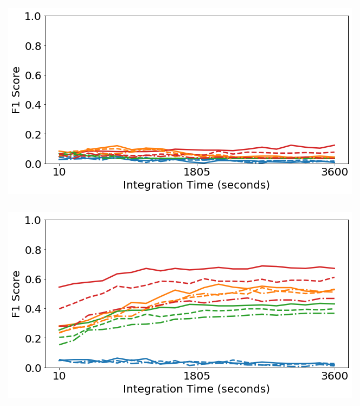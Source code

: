 \begin{figure}[H]
     \centering
     \begin{subfigure}[b]{0.49\textwidth}
         \centering
         \includegraphics[width=\textwidth]{images/generalization-shielding-aug-easy-01.png}
         \caption{}
         \label{fig:generalization-shielding-aug-easy-01}
     \end{subfigure}
     \hfill
     \begin{subfigure}[b]{0.49\textwidth}
         \centering
         \includegraphics[width=\textwidth]{images/generalization-shielding-aug-easy-05.png}
         \caption{}
         \label{fig:generalization-shielding-aug-easy-05}
     \end{subfigure}


\end{figure}
